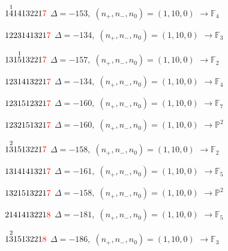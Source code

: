 \documentclass[10pt]{article}
\begin{document}
\smallskip

$1\overset{1}{4}1413221\textcolor{red}{7}$ \quad $\Delta=-153,\; (n_+,n_-,n_0)=(1,10,0)$ \quad $\to \mathbb{F}_{4}$

\smallskip

$1223141321\textcolor{red}{7}$ \quad $\Delta=-134,\; (n_+,n_-,n_0)=(1,10,0)$ \quad $\to \mathbb{F}_{3}$

\smallskip

$131\overset{1}{5}13221\textcolor{red}{7}$ \quad $\Delta=-157,\; (n_+,n_-,n_0)=(1,10,0)$ \quad $\to \mathbb{F}_{2}$

\smallskip

$1231413221\textcolor{red}{7}$ \quad $\Delta=-134,\; (n_+,n_-,n_0)=(1,10,0)$ \quad $\to \mathbb{F}_{4}$

\smallskip

$1231512321\textcolor{red}{7}$ \quad $\Delta=-160,\; (n_+,n_-,n_0)=(1,10,0)$ \quad $\to \mathbb{F}_{7}$

$1232151321\textcolor{red}{7}$ \quad $\Delta=-160,\; (n_+,n_-,n_0)=(1,10,0)$ \quad $\to \mathbb{P}^2$

\smallskip

$1\overset{2}{3}1513221\textcolor{red}{7}$ \quad $\Delta=-158,\; (n_+,n_-,n_0)=(1,10,0)$ \quad $\to \mathbb{F}_{2}$

\smallskip

$1314141321\textcolor{red}{7}$ \quad $\Delta=-161,\; (n_+,n_-,n_0)=(1,10,0)$ \quad $\to \mathbb{F}_{5}$

\smallskip

$1321513221\textcolor{red}{7}$ \quad $\Delta=-158,\; (n_+,n_-,n_0)=(1,10,0)$ \quad $\to \mathbb{P}^2$

\smallskip

$2141413221\textcolor{red}{8}$ \quad $\Delta=-181,\; (n_+,n_-,n_0)=(1,10,0)$ \quad $\to \mathbb{F}_{5}$

\smallskip

$1\overset{2}{3}1513221\textcolor{red}{8}$ \quad $\Delta=-186,\; (n_+,n_-,n_0)=(1,10,0)$ \quad $\to \mathbb{F}_{3}$
\end{document}
